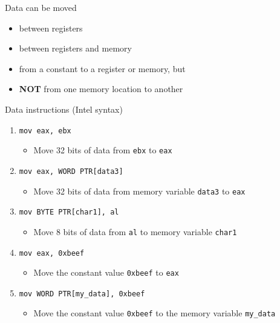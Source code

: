 \begin{frame}[fragile=singleslide]
  Data can be moved
  \begin{itemize}
  \item between registers
  \item between registers and memory
  \item from a constant to a register or memory, but
  \item \textbf{NOT} from one memory location to another
  \end{itemize}
  \begin{block}{Data instructions \scriptsize{(Intel syntax)}}
    \begin{enumerate}
    \item \texttt{mov eax, ebx}
      \begin{itemize}
      \item[] Move 32 bits of data from \texttt{ebx} to \texttt{eax}
      \end{itemize}
    \item \texttt{mov eax, WORD PTR[data3]}
      \begin{itemize}
      \item[] Move 32 bits of data from memory variable \texttt{data3} to \texttt{eax}
      \end{itemize}
    \item \texttt{mov BYTE PTR[char1], al}
      \begin{itemize}
      \item[] Move 8 bits of data from \texttt{al} to memory variable \texttt{char1}
      \end{itemize}
    \item \texttt{mov eax, 0xbeef}
      \begin{itemize}
      \item[] Move the constant value \texttt{0xbeef} to \texttt{eax}
      \end{itemize}
    \item \texttt{mov WORD PTR[my_data], 0xbeef}
      \begin{itemize}
      \item[] Move the constant value \texttt{0xbeef} to the memory variable
          \texttt{my\_data}
      \end{itemize}
    \end{enumerate}
  \end{block}
\end{frame}

